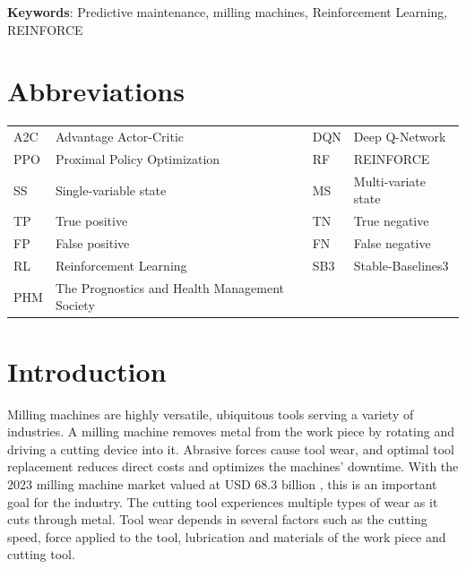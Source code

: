 \documentclass[a4paper, 12pt]{article}
\newcommand{\rowspace}[1]{\renewcommand{\arraystretch}{#1}}
\begin{document}
\noindent \textbf{Keywords}: Predictive maintenance, milling machines, Reinforcement Learning, REINFORCE

\section*{Abbreviations}

\begin{table}[!htbp]\centering
	\sffamily
	\rowspace{1.3}
	\begin{tabular}{L{1cm} L{4.5cm} L{1cm} L{4.5cm}}
		\toprule	
		
		A2C & Advantage Actor-Critic & DQN & Deep Q-Network\\
		PPO & Proximal Policy Optimization & RF & REINFORCE\\
		SS & Single-variable state & MS & Multi-variate state\\
		TP &True positive &TN &True negative\\
		FP &False positive &FN &False negative\\
		RL & Reinforcement Learning & SB3 & Stable-Baselines3\\
		PHM & The Prognostics and Health Management Society & & \\

		\bottomrule
	\end{tabular}
	\label{tbl:abbrev}
\end{table}

\newpage
\thispagestyle{empty}
\listoffigures
\listoftables

\section{Introduction}


Milling machines are highly versatile, ubiquitous tools serving a variety of industries. A milling machine removes metal from the work piece by rotating and driving a cutting device into it. Abrasive forces cause tool wear, and optimal tool replacement reduces direct costs and optimizes the machines' downtime. With the 2023 milling machine market valued at USD 68.3 billion \citep{milling-market}, this is an important goal for the industry. The cutting tool experiences multiple types of wear as it cuts through metal. Tool wear depends in several factors such as the cutting speed, force applied to the tool, lubrication and materials of the work piece and cutting tool. 
\end{document}
